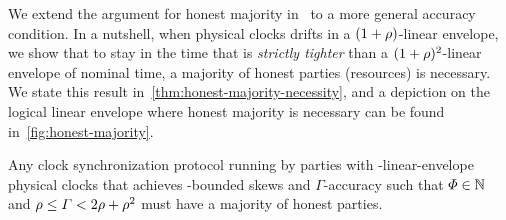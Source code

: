 We extend the argument for honest majority in~\cite{JACM:SriTou87} to a more general accuracy condition.
%
In a nutshell, when physical clocks drifts in a $(1 + \rho)$-linear envelope, we show that to stay in the time that is \emph{strictly tighter} than a $(1 + \rho)^2$-linear envelope of nominal time, a majority of honest parties (resources) is necessary.
%
We state this result in~\cref{thm:honest-majority-necessity}, and a depiction on the logical linear envelope where honest majority is necessary can be found in~\cref{fig:honest-majority}.



\begin{theorem} \label{thm:honest-majority-necessity}
    Any clock synchronization protocol running by parties with \clockDrift-linear-envelope physical clocks that achieves \maxSkew-bounded skews and $\varGamma$-accuracy such that $\varPhi \in \mathbb{N}$ and $\rho \le \varGamma < 2\rho + \rho^2$ must have a majority of honest parties.
\end{theorem}


